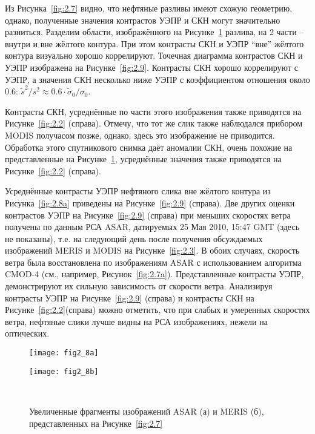 Из Рисунка~\ref{fig:2.7} видно, что нефтяные разливы имеют схожую геометрию, однако, полученные значения контрастов УЭПР и СКН могут значительно разниться. Разделим области, изображённого на Рисунке~\ref{fig:2.8} разлива, на 2 части -- внутри и вне жёлтого контура. При этом контрасты СКН и УЭПР ``вне'' жёлтого контура визуально хорошо коррелируют. Точечная диаграмма контрастов СКН и УЭПР изображена на Рисунке~\ref{fig:2.9}. Контрасты СКН хорошо коррелируют с УЭПР, а значения СКН несколько ниже УЭПР с коэффициентом отношения около 0.6: $\tilde{s}^{2} /s^{2} \approx 0.6\cdot \tilde{\sigma }_{0} /\sigma _{0}$.

Контрасты СКН, усреднённые по части этого изображения также приводятся на Рисунке~\ref{fig:2.2} (справа). Отмечу, что тот же слик также наблюдался прибором MODIS получасом позже, однако, здесь это изображение не приводится. Обработка этого спутникового снимка даёт аномалии СКН, очень похожие на представленные на Рисунке~\ref{fig:2.8}, усреднённые значения также приводятся на Рисунке~\ref{fig:2.2} (справа).

Усреднённые контрасты УЭПР нефтяного слика вне жёлтого контура из Рисунка~\ref{fig:2.8a} приведены на Рисунке~\ref{fig:2.9} (справа). Две других оценки контрастов УЭПР на Рисунке~\ref{fig:2.9} (справа) при меньших скоростях ветра получены по данным РСА ASAR, датируемых 25 Мая 2010, 15:47 GMT (здесь не показаны), т.е. на следующий день после получения обсуждаемых изображений MERIS и MODIS на Рисунке~\ref{fig:2.3}. В обоих случаях, скорость ветра была восстановлена по изображениям ASAR с использованием алгоритма CMOD-4 (см., например, Рисунок~\ref{fig:2.7a}). Представленные контрасты УЭПР, демонстрируют их сильную зависимость от скорости ветра. Анализируя контрасты УЭПР на Рисунке~\ref{fig:2.9} (справа) и контрасты СКН на Рисунке~\ref{fig:2.2}(справа) можно отметить, что при слабых и умеренных скоростях ветра, нефтяные слики лучше видны на РСА изображениях, нежели на оптических.



\begin{figure}[!ht]
   	\centering
	\begin{minipage}{.49\textwidth}
	    \subcaptionbox{\label{fig:2.8a}}
		{\texttt{[image: fig2\_8a]}}
	\end{minipage}
	\hfill
	\begin{minipage}{.49\textwidth}
	    \subcaptionbox{\label{fig:2.8b}}
		{\texttt{[image: fig2\_8b]}}
	\end{minipage}
    \\
    \caption{Увеличенные фрагменты изображений ASAR (а) и MERIS (б), представленных на Рисунке~\ref{fig:2.7}}
    \label{fig:2.8}
\end{figure}


